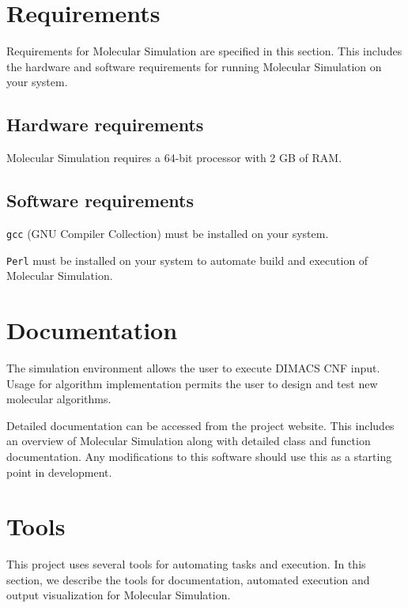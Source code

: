  	\section{Requirements}
 	
 	Requirements for Molecular Simulation are specified in this section.  This includes the hardware and software requirements for running Molecular Simulation on your system.

	\subsection{Hardware requirements}
	
	\par \noindent Molecular Simulation requires a 64-bit processor with 2 GB of RAM.  
 	
 	\subsection{Software requirements}
	
	\par \noindent \texttt{gcc} (GNU Compiler Collection) must be installed on your system. \\
	
	\par \noindent \texttt{Perl} must be installed on your system to automate build and execution of Molecular Simulation.
	

	\section{Documentation}

The simulation environment allows the user to execute DIMACS CNF input.  Usage for algorithm implementation permits the user to design and test new molecular algorithms.

Detailed documentation can be accessed from the project website.  This includes an overview of Molecular Simulation along with detailed class and function documentation.  Any modifications to this software should use this as a starting point in development. 
		
	\section{Tools}
	
This project uses several tools for automating tasks and execution.  In this section, we describe the tools for documentation, automated execution and output visualization for Molecular Simulation.
		
